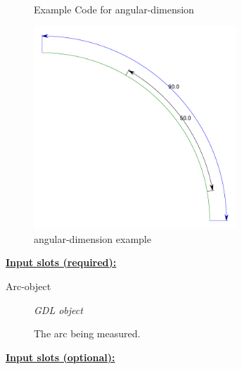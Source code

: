 \documentclass [11pt]{book}
\begin{document}
\begin{itemize}
\begin{figure}
\begin{lrbox}{\boxedverb}
\begin{minipage}{\linewidth}
{\begin{verbatim}
  
\end{verbatim}}
\end{minipage}
\end{lrbox}
\fbox{\usebox{\boxedverb}}

\caption{Example Code for angular-dimension}

\label{fig:example-code-angular-dimension}

\end{figure}

\begin{figure}
\begin{center}
\includegraphics[width=3in,height=3in]{../images/example-angular-dimension.pdf}
\end{center}

\caption{angular-dimension example}

\label{fig:angular-dimension}

\end{figure}





\textbf{
\underline{Input slots (required):}}

\begin{description}

\item [Arc-object]
\emph{GDL object}

 The arc being measured.




\end{description}






\textbf{
\underline{Input slots (optional):}}

\begin{description}


\end{description}
\end{itemize}
\end{document}
